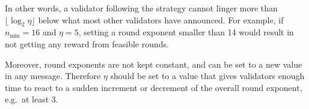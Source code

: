 \documentclass[12pt]{article}
\begin{document}
In other words, a validator following the strategy cannot linger more than $\lfloor \log_2\eta\rfloor$ below what most other validators have announced. For example, if $n_{\min}=16$ and $\eta = 5$, setting a round exponent smaller than 14 would result in not getting any reward from feasible rounds.

Moreover, round exponents are not kept constant, and can be set to a new value in any message. Therefore $\eta$ should be set to a value that gives validators enough time to react to a sudden increment or decrement of the overall round exponent, e.g.~at least 3.



\newpage

\printbibliography
\end{document}
